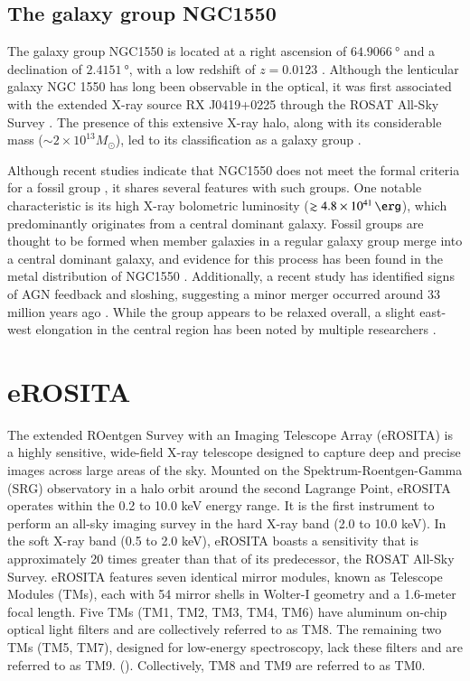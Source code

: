 \subsection{The galaxy group NGC1550}\label{sec:ngc1550}
The galaxy group NGC1550 is located at a right ascension of \(\SI{64.9066}{\degree}\) and a declination of \(\SI{2.4151}{\degree}\), with a low redshift of \(z = 0.0123\) \cite{Reiprich_2002}. Although the lenticular galaxy NGC 1550 has long been observable in the optical, it was first associated with the extended X-ray source RX J0419+0225 through the ROSAT All-Sky Survey \cite{Bohringer_2000}. The presence of this extensive X-ray halo, along with its considerable mass (\(\sim 2 \times 10^{13} M_{\odot}\)), led to its classification as a galaxy group \cite{Kawaharada_2003}.

Although recent studies indicate that NGC1550 does not meet the formal criteria for a fossil group \cite{Sun_2003}, it shares several features with such groups. One notable characteristic is its high X-ray bolometric luminosity (\(\gtrsim \SI{4.8e41}{\erg}\)), which predominantly originates from a central dominant galaxy. Fossil groups are thought to be formed when member galaxies in a regular galaxy group merge into a central dominant galaxy, and evidence for this process has been found in the metal distribution of NGC1550 \cite{Kawaharada_2009, Sato_2010}. Additionally, a recent study has identified signs of AGN feedback and sloshing, suggesting a minor merger occurred around 33 million years ago \cite{Kolokythas_2020}. While the group appears to be relaxed overall, a slight east-west elongation in the central region has been noted by multiple researchers \cite{Kolokythas_2020, Sun_2003}.
%
\section{eROSITA}
The extended ROentgen Survey with an Imaging Telescope Array (eROSITA) is a highly sensitive, wide-field X-ray telescope designed to capture deep and precise images across large areas of the sky. Mounted on the Spektrum-Roentgen-Gamma (SRG) observatory in a halo orbit around the second Lagrange Point, eROSITA operates within the 0.2 to 10.0 keV energy range. It is the first instrument to perform an all-sky imaging survey in the hard X-ray band (2.0 to 10.0 keV). In the soft X-ray band (0.5 to 2.0 keV), eROSITA boasts a sensitivity that is approximately 20 times greater than that of its predecessor, the ROSAT All-Sky Survey. eROSITA features seven identical mirror modules, known as Telescope Modules (TMs), each with 54 mirror shells in Wolter-I geometry and a 1.6-meter focal length. Five TMs (TM1, TM2, TM3, TM4, TM6) have aluminum on-chip optical light filters and are collectively referred to as TM8. The remaining two TMs (TM5, TM7), designed for low-energy spectroscopy, lack these filters and are referred to as TM9. (\cite{Predehl2021}). Collectively, TM8 and TM9 are referred to as TM0.

